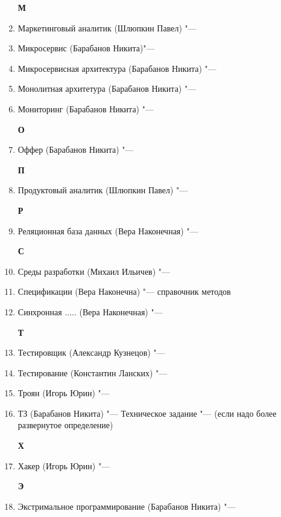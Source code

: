 \documentclass{article}
\begin{document}
\begin{enumerate}
    \textbf{М}
    \item  {Маркетинговый аналитик (Шлюпкин Павел) "--- }
    \item {Микросервис (Барабанов Никита)"---}
    \item {Микросервисная архитектура (Барабанов Никита) "---}
    \item {Монолитная архитетура (Барабанов Никита) "--- }
    \item {Мониторинг (Барабанов Никита) "--- }
    
    \textbf{О}
    \item {Оффер (Барабанов Никита) "---}
    
    \textbf{П}
    \item {Продуктовый аналитик (Шлюпкин Павел) "---}
    
    \textbf{Р}
    \item {Реляционная база данных (Вера Наконечная) "---}

    \textbf{С}
    \item {Среды разработки (Михаил Ильичев) "--- }
    \item {Спецификации (Вера Наконечна) "--- справочник методов}
    \item {Синхронная ..... (Вера Наконечная) "---}
    
    \textbf{Т}
    \item {Тестировщик (Александр Кузнецов) "--- }
    \item {Тестирование (Константин Ланских) "--- }
    \item {Троян (Игорь Юрин) "--- }
    \item {ТЗ (Барабанов Никита) "--- Техническое задание "--- (если надо более развернутое определение)}

    \textbf{Х}
    \item {Хакер (Игорь Юрин) "---}

    \textbf{Э}
    \item {Экстримальное программирование (Барабанов Никита) "---}

\end{enumerate}
\end{document}
